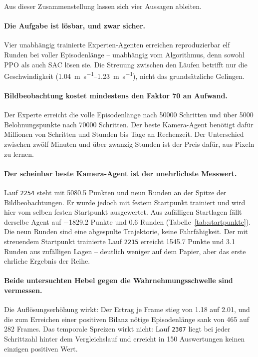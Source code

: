 Aus dieser Zusammenstellung lassen sich vier Aussagen ableiten.

\paragraph{Die Aufgabe ist lösbar, und zwar sicher.}
Vier unabhängig trainierte Experten-Agenten erreichen reproduzierbar elf Runden bei voller Episodenlänge -- unabhängig vom Algorithmus, denn sowohl \ac{PPO} als auch \ac{SAC} lösen sie. Die Streuung zwischen den Läufen betrifft nur die Geschwindigkeit (\SIrange{1.04}{1.23}{\meter\per\second}), nicht das grundsätzliche Gelingen.

\paragraph{Bildbeobachtung kostet mindestens den Faktor 70 an Aufwand.}
Der Experte erreicht die volle Episodenlänge nach \num{50000} Schritten und über \num{5000} Belohnungspunkte nach \num{70000} Schritten. Der beste Kamera-Agent benötigt dafür Millionen von Schritten und Stunden bis Tage an Rechenzeit. Der Unterschied zwischen zwölf Minuten und über zwanzig Stunden ist der Preis dafür, aus Pixeln zu lernen.

\paragraph{Der scheinbar beste Kamera-Agent ist der unehrlichste Messwert.}
Lauf \texttt{2254} steht mit \num{5080.5} Punkten und neun Runden an der Spitze der Bildbeobachtungen. Er wurde jedoch mit festem Startpunkt trainiert und wird hier vom selben festen Startpunkt ausgewertet. Aus zufälligen Startlagen fällt derselbe Agent auf \num{-1829.2} Punkte und \num{0.6} Runden (Tabelle~\ref{tab:startpunkte}). Die neun Runden sind eine abgespulte Trajektorie, keine Fahrfähigkeit. Der mit streuendem Startpunkt trainierte Lauf \texttt{2215} erreicht \num{1545.7} Punkte und \num{3.1} Runden aus zufälligen Lagen -- deutlich weniger auf dem Papier, aber das erste ehrliche Ergebnis der Reihe.

\paragraph{Beide untersuchten Hebel gegen die Wahrnehmungsschwelle sind vermessen.}
Die Auflösungserhöhung wirkt: Der Ertrag je Frame stieg von \num{1.18} auf \num{2.01}, und die zum Erreichen einer positiven Bilanz nötige Episodenlänge sank von \num{465} auf \num{282} Frames. Das temporale Spreizen wirkt nicht: Lauf \texttt{2307} liegt bei jeder Schrittzahl hinter dem Vergleichslauf und erreicht in \num{150} Auswertungen keinen einzigen positiven Wert.

